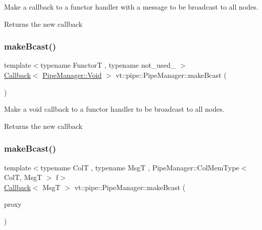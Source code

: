 Make a callback to a functor handler with a message to be broadcast to all nodes. 

\begin{DoxyReturn}{Returns}
the new callback 
\end{DoxyReturn}
\mbox{\label{structvt_1_1pipe_1_1_pipe_manager_a42e6860c842d31411b7d90154a0c6a17}} 
\subsubsection{\texorpdfstring{make\+Bcast()}{makeBcast()}\hspace{0.1cm}{\footnotesize\ttfamily [3/6]}}
{\footnotesize\ttfamily template$<$typename FunctorT , typename not\+\_\+used\+\_\+ $>$ \\
\hyperlink{namespacevt_a36db99df4c973d48b1118a293fff533f}{Callback}$<$ \hyperlink{structvt_1_1pipe_1_1_pipe_manager_ab720c2580ecfd3ab36e49aeaaff64cc6}{Pipe\+Manager\+::\+Void} $>$ vt\+::pipe\+::\+Pipe\+Manager\+::make\+Bcast (\begin{DoxyParamCaption}{ }\end{DoxyParamCaption})}



Make a void callback to a functor handler to be broadcast to all nodes. 

\begin{DoxyReturn}{Returns}
the new callback 
\end{DoxyReturn}
\mbox{\label{structvt_1_1pipe_1_1_pipe_manager_a1fefc503b58bbdf791e76a6c8f339df6}} 
\subsubsection{\texorpdfstring{make\+Bcast()}{makeBcast()}\hspace{0.1cm}{\footnotesize\ttfamily [4/6]}}
{\footnotesize\ttfamily template$<$typename ColT , typename MsgT , Pipe\+Manager\+::\+Col\+Mem\+Type$<$ Col\+T, Msg\+T $>$ f$>$ \\
\hyperlink{namespacevt_a36db99df4c973d48b1118a293fff533f}{Callback}$<$ MsgT $>$ vt\+::pipe\+::\+Pipe\+Manager\+::make\+Bcast (\begin{DoxyParamCaption}\item[{\hyperlink{structvt_1_1pipe_1_1_pipe_manager_t_l_af56c58cad882496e35f01227d4da3898}{Col\+Proxy\+Type}$<$ ColT $>$}]{proxy }\end{DoxyParamCaption})}



